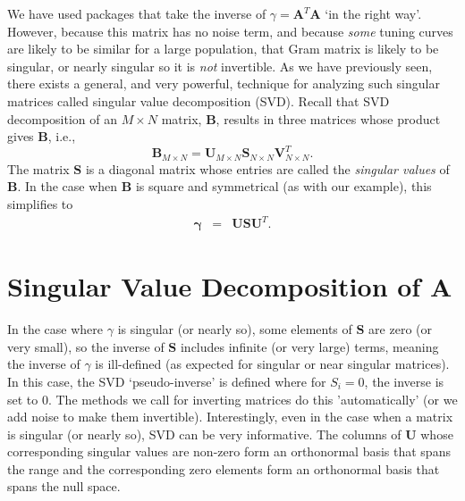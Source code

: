 \documentclass[10pt,letterpaper,oneside]{article}
\begin{document}
We have used packages that take the inverse of $\gamma = \mathbf{A}^{T}\mathbf{A}$ `in the right way'. However, because this matrix has no noise term, and because \emph{some} tuning curves are likely to be similar for a large population, that Gram matrix is likely to be singular, or nearly singular
so it is \emph{not} invertible. As we have previously seen, there exists a general, and very powerful, technique for analyzing
such singular matrices called singular value decomposition (SVD).
Recall that SVD decomposition of an $M\times N$ matrix, $\mathbf{B}$, results in three matrices whose product gives $\mathbf{B}$, i.e.,
\[
\mathbf{B}_{M\times N}=\mathbf{U}_{M\times N}\mathbf{S}_{N\times N}\mathbf{V}_{N\times N}^{T}.
\]
The matrix $\mathbf{S}$ is a diagonal matrix whose entries are called
the \emph{singular values} of $\mathbf{B}$. In the case when $\mathbf{B}$ is square and symmetrical (as with our example), this simplifies to
\begin{eqnarray*}
\boldsymbol{\gamma} & = & \mathbf{USU}^{T}.
\end{eqnarray*}

\section{Singular Value Decomposition of $\mathbf{A}$}

In the case where $\gamma$ is singular (or nearly so), some elements
of $\mathbf{S}$ are zero (or very small), so the inverse of $\mathbf{S}$
includes infinite (or very large) terms, meaning the inverse of $\gamma$
is ill-defined (as expected for singular or near singular matrices).
In this case, the SVD `pseudo-inverse' is defined where for $S_{i}=0$,
the inverse is set to $0$. The methods we call for inverting matrices do this 'automatically' (or we add noise to make them invertible). Interestingly, even in the case when a matrix is singular (or nearly so), SVD can
be very informative. The columns of $\mathbf{U}$ whose corresponding
singular values are non-zero form an orthonormal basis that spans
the range and the corresponding zero elements form an orthonormal
basis that spans the null space.
\end{document}
